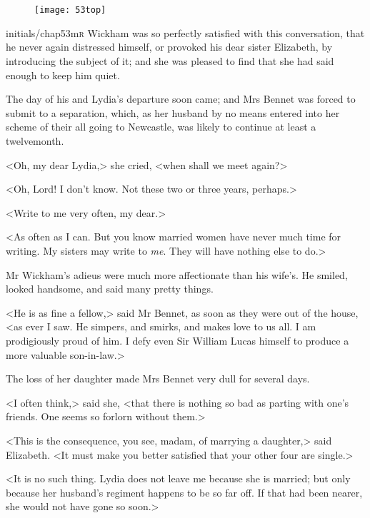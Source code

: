 \chapter[Chapter \thechapter]{}
	
	
\begin{figure}[t!]
\centering
\texttt{[image: 53top]}
\end{figure}


\lettrine[lines=6,image=true]{initials/chap53m}{r}  Wickham was so perfectly satisfied with this conversation, that he never again distressed himself, or provoked his dear sister Elizabeth, by introducing the subject of it; and she was pleased to find that she had said enough to keep him quiet.

\zz
The day of his and Lydia's departure soon came; and Mrs Bennet was forced to submit to a separation, which, as her husband by no means entered into her scheme of their all going to Newcastle, was likely to continue at least a twelvemonth.

<Oh, my dear Lydia,> she cried, <when shall we meet again?>

<Oh, Lord! I don't know. Not these two or three years, perhaps.>

<Write to me very often, my dear.>

<As often as I can. But you know married women have never much time for writing. My sisters may write to \textit{me}. They will have nothing else to do.>

Mr Wickham's adieus were much more affectionate than his wife's. He smiled, looked handsome, and said many pretty things.

<He is as fine a fellow,> said Mr Bennet, as soon as they were out of the house, <as ever I saw. He simpers, and smirks, and makes love to us all. I am prodigiously proud of him. I defy even Sir William Lucas himself to produce a more valuable son-in-law.>

The loss of her daughter made Mrs Bennet very dull for several days.

<I often think,> said she, <that there is nothing so bad as parting with one's friends. One seems so forlorn without them.>

<This is the consequence, you see, madam, of marrying a daughter,> said Elizabeth. <It must make you better satisfied that your other four are single.>

<It is no such thing. Lydia does not leave me because she is married; but only because her husband's regiment happens to be so far off. If that had been nearer, she would not have gone so soon.>


